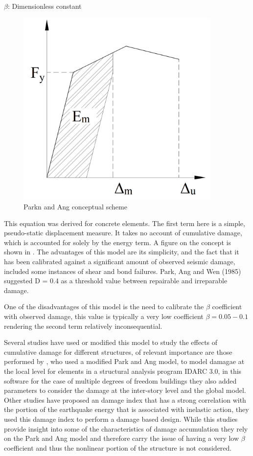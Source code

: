$\beta$: Dimensionless constant 

\begin{figure}[htbp]
\centering
\includegraphics[width=0.9\textwidth]{Chapter-2/figs/Park_and_Ang_Model}
\caption{Parkn and Ang conceptual scheme}
\label{fig:Paa}
\end{figure}

This equation was derived for concrete elements. The first term here is a simple, pseudo-static displacement measure. It takes no account of cumulative damage, which is accounted for solely by the energy term. A figure on the concept is shown in . The advantages of this model are its simplicity, and the fact that it has been calibrated against a significant amount of observed seismic damage, included some instances of shear and bond failures. Park, Ang and Wen (1985) suggested D = 0.4 as a threshold value between repairable and irreparable damage. 

One of the disadvantages of this model is the need to calibrate the $\beta$ coefficient with observed damage, this value is typically a very low coefficient $\beta=0.05-0.1$ rendering the second term relatively inconsequential. 

Several studies have used or modified this model to study the effects of cumulative damage for different structures,  of relevant importance are those performed by \cite{Kunnath1992}, who used a modified Park and Ang model, to model damagae at the local level for elements in a structural analysis program IDARC 3.0, in this software for the case of multiple degrees of freedom buildings they also added parameters to consider the damage at the inter-story level and the global model. Other studies \cite{Khashaee} have proposed an damage index that has a strong correlation with the portion of the earthquake energy that is associated with inelastic action, they used this damage index to perform a damage based design. While this studies provide insight into some of the characteristics of damage accumulation they rely on the Park and Ang model and therefore carry the issue of having a very low $\beta$ coefficient and thus the nonlinear portion of the structure is not considered.

